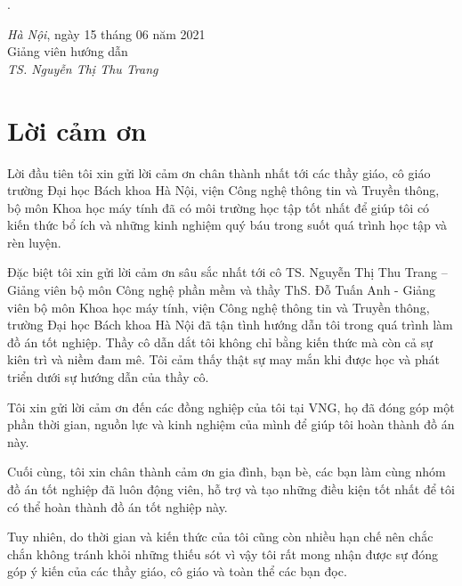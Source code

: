 \documentclass[a4paper, 13pt, oneside]{report}
\begin{document}

\begin{minipage}{0.5\textwidth}
    .
\end{minipage}
\begin{minipage}[t]{0.5\textwidth}
    
    \begin{center}
        \textit{Hà Nội}, ngày 15 tháng 06 năm 2021 \\
        Giảng viên hướng dẫn\\[3cm]
        
        \textit{TS. Nguyễn Thị Thu Trang}
    \end{center}
\end{minipage}
\newpage

\chapter*{\centering Lời cảm ơn}
Lời đầu tiên tôi xin gửi lời cảm ơn chân thành nhất tới các thầy giáo, cô giáo trường Đại học Bách khoa Hà Nội, viện Công nghệ thông tin và Truyền thông, bộ môn Khoa học máy tính đã có môi trường học tập tốt nhất để giúp tôi có kiến thức bổ ích và những kinh nghiệm quý báu trong suốt quá trình học tập và rèn luyện.

Đặc biệt tôi xin gửi lời cảm ơn sâu sắc nhất tới cô TS. Nguyễn Thị Thu Trang – Giảng viên bộ môn Công nghệ phần mềm và thầy ThS. Đỗ Tuấn Anh - Giảng viên bộ môn Khoa học máy tính, viện Công nghệ thông tin và Truyền thông, trường Đại học Bách khoa Hà Nội đã tận tình hướng dẫn tôi trong quá trình làm đồ án tốt nghiệp. Thầy cô dẫn dắt tôi không chỉ bằng kiến thức mà còn cả sự kiên trì và niềm đam mê. Tôi cảm thấy thật sự may mắn khi được học và phát triển dưới sự hướng dẫn của thầy cô.

Tôi xin gửi lời cảm ơn đến các đồng nghiệp của tôi tại VNG, họ đã đóng góp một phần thời gian, nguồn lực và kinh nghiệm của mình để giúp tôi hoàn thành đồ án này.

Cuối cùng, tôi xin chân thành cảm ơn gia đình, bạn bè, các bạn làm cùng nhóm đồ án tốt nghiệp đã luôn động viên, hỗ trợ và tạo những điều kiện tốt nhất để tôi có thể hoàn thành đồ án tốt nghiệp này.

Tuy nhiên, do thời gian và kiến thức của tôi cũng còn nhiều hạn chế nên chắc chắn không tránh khỏi những thiếu sót vì vậy tôi rất mong nhận được sự đóng góp ý kiến của các thầy giáo, cô giáo và toàn thể các bạn đọc.
\end{document}

